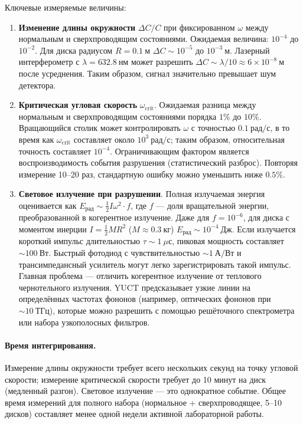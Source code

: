 \documentclass[12pt,a4paper]{article}
\begin{document}
	Ключевые измеряемые величины:
	\begin{enumerate}
		\item \textbf{Изменение длины окружности} \(\Delta C/C\) при фиксированном \(\omega\) между нормальным и сверхпроводящим состояниями. Ожидаемая величина: \(10^{-4}\) до \(10^{-2}\). Для диска радиусом \(R = 0.1\ \text{м}\) \(\Delta C \sim 10^{-5}\) до \(10^{-3}\ \text{м}\). Лазерный интерферометр с \(\lambda = 632.8\ \text{нм}\) может разрешить \(\Delta C \sim \lambda/10 \approx 6\times10^{-8}\ \text{м}\) после усреднения. Таким образом, сигнал значительно превышает шум детектора.
		
		\item \textbf{Критическая угловая скорость} \(\omega_{\text{crit}}\). Ожидаемая разница между нормальным и сверхпроводящим состояниями порядка \(1\%\) до \(10\%\). Вращающийся столик может контролировать \(\omega\) с точностью \(0.1\ \text{рад/с}\), в то время как \(\omega_{\text{crit}}\) составляет около \(10^3\ \text{рад/с}\); таким образом, относительная точность составляет \(10^{-4}\). Ограничивающим фактором является воспроизводимость события разрушения (статистический разброс). Повторяя измерение 10–20 раз, стандартную ошибку можно уменьшить ниже \(0.5\%\).
		
		\item \textbf{Световое излучение при разрушении}. Полная излучаемая энергия оценивается как \(E_{\text{рад}} \sim \frac{1}{2} I \omega^2 \cdot f\), где \(f\) — доля вращательной энергии, преобразованной в когерентное излучение. Даже для \(f = 10^{-6}\), для диска с моментом инерции \(I = \frac{1}{2} M R^2\) (\(M \approx 0.3\ \text{кг}\)) \(E_{\text{рад}} \sim 10^{-4}\ \text{Дж}\). Если излучается короткий импульс длительностью \(\tau \sim 1\ \mu\text{с}\), пиковая мощность составляет \(\sim 100\ \text{Вт}\). Быстрый фотодиод с чувствительностью \(\sim 1\ \text{А/Вт}\) и трансимпедансный усилитель могут легко зарегистрировать такой импульс. Главная проблема — отличить когерентное излучение от теплового чернотельного излучения. YUCT предсказывает узкие линии на определённых частотах фононов (например, оптических фононов при \(\sim 10\ \text{ТГц}\)), которые можно разрешить с помощью решёточного спектрометра или набора узкополосных фильтров.
	\end{enumerate}
	
	\paragraph{Время интегрирования.}
	Измерение длины окружности требует всего нескольких секунд на точку угловой скорости; измерение критической скорости требует до 10 минут на диск (медленный разгон). Световое излучение — это однократное событие. Общее время измерений для полного набора (нормальное + сверхпроводящее, 5–10 дисков) составляет менее одной недели активной лабораторной работы.
	
\end{document}
